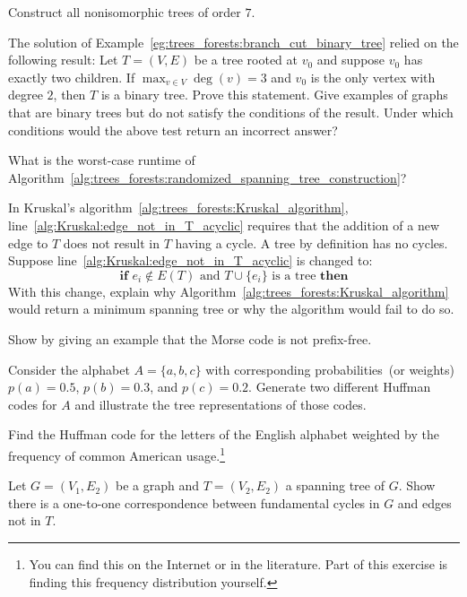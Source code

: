 \begin{problem}
\item Construct all nonisomorphic trees of order $7$.

\item\label{prob:trees_forests:binary_tree_test} The solution of
  Example~\ref{eg:trees_forests:branch_cut_binary_tree} relied on the
  following result: Let $T = (V,E)$ be a tree rooted at $v_0$ and
  suppose $v_0$ has exactly two children. If
  $\max_{v \in V} \deg(v) = 3$ and $v_0$ is the only vertex with
  degree $2$, then $T$ is a binary tree. Prove this statement. Give
  examples of graphs that are binary trees but do not satisfy the
  conditions of the result. Under which conditions would the above
  test return an incorrect answer?

\item What is the worst-case runtime of
  Algorithm~\ref{alg:trees_forests:randomized_spanning_tree_construction}?

\item In Kruskal's
  algorithm~\ref{alg:trees_forests:Kruskal_algorithm},
  line~\ref{alg:Kruskal:edge_not_in_T_acyclic} requires that the
  addition of a new edge to $T$ does not result in $T$ having a
  cycle. A tree by definition has no cycles. Suppose
  line~\ref{alg:Kruskal:edge_not_in_T_acyclic} is changed to:
  \[
  \textbf{if } e_i \notin E(T)
  \text{ and }
  T \cup \{e_i\} \text{ is a tree } \textbf{then}
  \]
  With this change, explain why
  Algorithm~\ref{alg:trees_forests:Kruskal_algorithm} would return a
  minimum spanning tree or why the algorithm would fail to do so.

\item Show by giving an example that the Morse code is not
  prefix-free.

\item Consider the alphabet $A = \{a,b,c\}$ with corresponding
  probabilities~(or weights) $p(a) = 0.5$, $p(b) = 0.3$, and
  $p(c) = 0.2$. Generate two different Huffman codes for $A$ and
  illustrate the tree representations of those codes.

\item Find the Huffman code for the letters of the English alphabet
  weighted by the frequency of common American usage.\footnote{
    You can find this on the Internet or in the literature. Part of
    this exercise is finding this frequency distribution yourself.}

\item Let $G=(V_1,E_2)$ be a graph and $T=(V_2,E_2)$ a spanning tree
  of $G$. Show there is a one-to-one correspondence between
  fundamental cycles in $G$ and edges not in $T$.


\end{problem}
